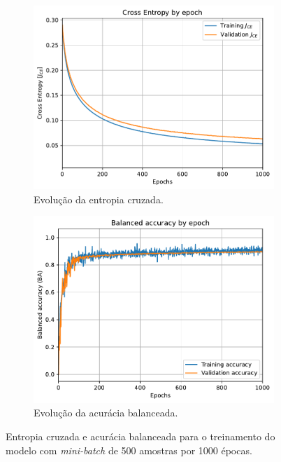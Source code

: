 \begin{figure}[H]
	\begin{subfigure}[H]{0.49\textwidth}
		\centering
		\includegraphics[width = 0.98\linewidth]{../../plot/LR_1/CE_1000_epochs_batch_size500}
		\caption{Evolução da entropia cruzada.}
		\label{fig:CE_1000_epochs_batch_size500}
	\end{subfigure}
	\begin{subfigure}[H]{0.49\textwidth}
		\centering
		\includegraphics[width = 0.99\linewidth]{../../plot/LR_1/BA_1000_epochs_batch_size500}
		\caption{Evolução da acurácia balanceada.}
		\label{fig:BA_1000_epochs_batch_size500}
	\end{subfigure}
	\caption{Entropia cruzada e acurácia balanceada para o treinamento do modelo com \textit{mini-batch} de 500 amostras por 1000 épocas.}
\end{figure}





